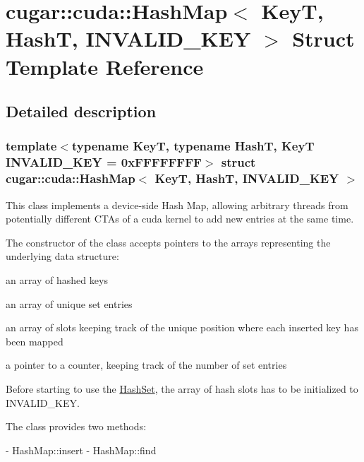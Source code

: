 \hypertarget{structcugar_1_1cuda_1_1_hash_map}{}\section{cugar\+:\+:cuda\+:\+:Hash\+Map$<$ KeyT, HashT, I\+N\+V\+A\+L\+I\+D\+\_\+\+K\+EY $>$ Struct Template Reference}
\label{structcugar_1_1cuda_1_1_hash_map}


\subsection{Detailed description}
\subsubsection*{template$<$typename KeyT, typename HashT, KeyT I\+N\+V\+A\+L\+I\+D\+\_\+\+K\+EY = 0x\+F\+F\+F\+F\+F\+F\+FF$>$\newline
struct cugar\+::cuda\+::\+Hash\+Map$<$ Key\+T, Hash\+T, I\+N\+V\+A\+L\+I\+D\+\_\+\+K\+E\+Y $>$}

This class implements a device-\/side Hash Map, allowing arbitrary threads from potentially different C\+T\+As of a cuda kernel to add new entries at the same time.

The constructor of the class accepts pointers to the arrays representing the underlying data structure\+:


\begin{DoxyItemize}
\item an array of hashed keys
\item an array of unique set entries
\item an array of slots keeping track of the unique position where each inserted key has been mapped
\item a pointer to a counter, keeping track of the number of set entries
\end{DoxyItemize}

Before starting to use the \hyperlink{structcugar_1_1cuda_1_1_hash_set}{Hash\+Set}, the array of hash slots has to be initialized to I\+N\+V\+A\+L\+I\+D\+\_\+\+K\+EY.

The class provides two methods\+: \begin{DoxyVerb}- HashMap::insert
- HashMap::find
\end{DoxyVerb}


